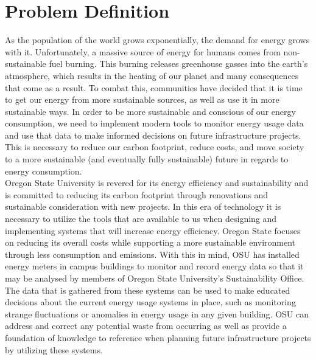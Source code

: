 \documentclass[onecolumn, draftclsnofoot,10pt, compsoc]{IEEEtran}
\begin{document}
    \section{Problem Definition}
    As the population of the world grows exponentially, the demand for energy grows with it. Unfortunately, a massive source of energy for humans comes from non-sustainable fuel burning. This burning releases greenhouse gasses into the earth's atmosphere, which results in the heating of our planet and many consequences that come as a result. To combat this, communities have decided that it is time to get our energy from more sustainable sources, as well as use it in more sustainable ways. In order to be more sustainable and conscious of our energy consumption, we need to implement modern tools to monitor energy usage data and use that data to make informed decisions on future infrastructure projects. This is necessary to reduce our carbon footprint, reduce costs, and move society to a more sustainable (and eventually fully sustainable) future in regards to energy consumption.\\
    \indent Oregon State University is revered for its energy efficiency and sustainability and is committed to reducing its carbon footprint through renovations and sustainable consideration with new projects. In this era of technology it is necessary to utilize the tools that are available to us when designing and implementing systems that will increase energy efficiency. Oregon State focuses on reducing its overall costs while supporting a more sustainable environment through less consumption and emissions. With this in mind, OSU has installed energy meters in campus buildings to monitor and record energy data so that it may be analysed by members of Oregon State University's Sustainability Office.  The data that is gathered from these systems can be used to make educated decisions about the current energy usage systems in place, such as monitoring strange fluctuations or anomalies in energy usage in any given building. OSU can address and correct any potential waste from occurring as well as provide a foundation of knowledge to reference when planning future infrastructure projects by utilizing these systems.\\ 
\end{document}
